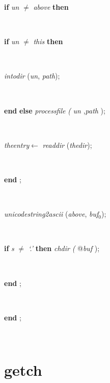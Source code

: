 \documentclass[10pt, a4paper]{article}
\begin{document}
\begin{tabbing}
\+\parbox{14cm}{\textsf {\textbf {if } \textsf{\textit{un} $\neq$ \textit{above}} \textbf{ then } }}\\
\+\parbox{14cm}{\textsf {\textbf {if } \textsf{\textit{un} $\neq$ \textit{this}} \textbf{ then } }}\\
\-\-\parbox{14cm}{\textsf{\textit{intodir} (\textit{un}, \textit{path})}; }\\
\<\-\parbox{14cm}{\textsf{\textbf{end}  \textbf{else}  \textit{processfile}  \textit{(} \textit{un} ,\textit{path} );}}\\
\parbox{14cm}{\textsf{\textit{theentry}$\leftarrow$ \textit{readdir} (\textit{thedir})}; }\\
\<\-\parbox{14cm}{\textsf{\textbf{end} ;}}\\
\parbox{14cm}{\textsf{\textit{unicodestring2ascii} (\textit{above}, \textit{buf}$_{0}$)}; }\\
\parbox{14cm}{\textsf {\textbf {if } \textsf{\textit{s} $\neq$ \textit{\textrm{\textup { `.' } }}} \textbf{ then } \textsf{	\textit{chdir} \textit{(} @\textit{buf} );}}}\\
\<\-\parbox{14cm}{\textsf{\textbf{end} ;}}\\
\<\-\parbox{14cm}{\textsf{\textbf{end} ;}}\\
\end{tabbing}
\section{getch}\label{sec:indexfiles/loadsetgetch}
\end{document}

